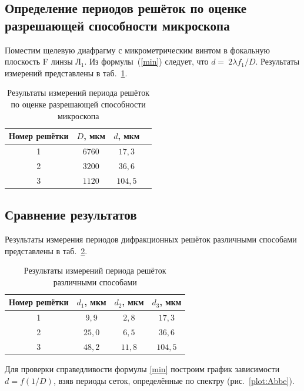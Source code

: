 \documentclass[a4paper, 12pt]{article}
\begin{document}
\newpage

\subsection{Определение периодов решёток по оценке разрешающей способности микроскопа}

Поместим щелевую диафрагму с микрометрическим винтом в фокальную плоскость F линзы Л$_1$. Из формулы~(\ref{min}) следует, что $d =~2\lambda f_1 / D$. Результаты измерений представлены в таб.~\ref{tab3}.

\begin{table}[h!]
\begin{center}
\begin{tabular}{|c|c|c|c|}
\hline 
Номер решётки & $D$, мкм & $d$, мкм \\ 
\hline 
1 & $6760$ & $17,3$ \\ 
\hline 
2 & $3200$ & $36,6$ \\ 
\hline 
3 & $1120$ & $104,5$ \\ 
\hline  
\end{tabular} 
\end{center}
\caption{Результаты измерений периода решёток по оценке разрешающей способности микроскопа}
\label{tab3}
\end{table}

\subsection{Сравнение результатов}

Результаты измерения периодов дифракционных решёток различными способами представлены в таб.~\ref{tab:all}.

\begin{table}[h!]
\begin{center}
\begin{tabular}{|c|c|c|c|}
\hline 
Номер решётки & $d_1$, мкм & $d_2$, мкм & $d_3$, мкм \\ 
\hline 
1 & $9,9$ & $2,8$ & $17,3$ \\ 
\hline 
2 & $25,0$ & $6,5$ & $36,6$ \\ 
\hline 
3 & $48,2$ & $11,8$ & $104,5$ \\ 
\hline  
\end{tabular} 
\end{center}
\caption{Результаты измерений периода решёток различными способами}
\label{tab:all}
\end{table}

Для проверки справедливости формулы \eqref{min} построим график зависимости $d = f(1/D)$, взяв периоды сеток, определённые по спектру (рис.~\ref{plot:Abbe}).
\end{document}
